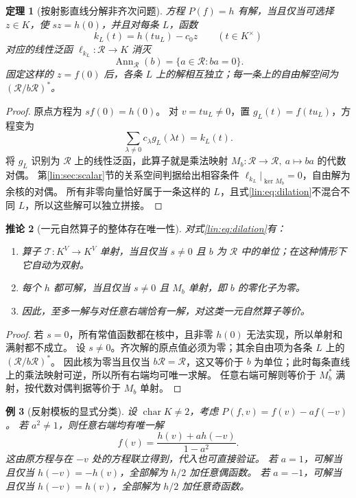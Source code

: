 \documentclass[11pt,a4paper,oneside,openany]{book}
\theoremstyle{lecture}
\newtheorem{theorem}{定理}[section]
\newtheorem{corollary}[theorem]{推论}
\newtheorem{example}[theorem]{例}
\newcommand{\T}{\mathcal T}
\numberwithin{equation}{section}
\begin{document}
\begin{theorem}[按射影直线分解非齐次问题]\label{lin:thm:dilationsolve}
方程 $P(f)=h$ 有解，当且仅当可选择 $z\in K$，使 $sz=h(0)$，并且对每条 $L$，函数
\[
 k_L(t)=h(tu_L)-c_0z\qquad(t\in K^\times)
\]
对应的线性泛函 $\ell_{k_L}:\mathcal R\to K$ 消灭
\[
 \operatorname{Ann}_{\mathcal R}(b)=\{a\in\mathcal R:ba=0\}.
\]
固定这样的 $z=f(0)$ 后，各条 $L$ 上的解相互独立；每一条上的自由解空间为 $(\mathcal R/b\mathcal R)^*$。
\end{theorem}
\begin{proof}
原点方程为 $sf(0)=h(0)$。
对 $v=tu_L\ne0$，置 $g_L(t)=f(tu_L)$，方程变为
\[
 \sum_{\lambda\ne0}c_\lambda g_L(\lambda t)=k_L(t).
\]
将 $g_L$ 识别为 $\mathcal R$ 上的线性泛函，此算子就是乘法映射
$M_b:\mathcal R\to\mathcal R,\ a\mapsto ba$ 的代数对偶。
第\ref{lin:sec:scalar}节的关系空间判据给出相容条件 $\ell_{k_L}|_{\ker M_b}=0$，自由解为余核的对偶。
所有非零向量恰好属于一条这样的 $L$，且式\eqref{lin:eq:dilation}不混合不同 $L$，所以这些解可以独立拼接。
\end{proof}

\begin{corollary}[一元自然算子的整体存在唯一性]\label{lin:cor:dilationbij}
对式\eqref{lin:eq:dilation}有：
\begin{enumerate}
\item 算子 $\T:K^V\to K^V$ 单射，当且仅当 $s\ne0$ 且 $b$ 为 $\mathcal R$ 中的单位；在这种情形下它自动为双射。
\item 每个 $h$ 都可解，当且仅当 $s\ne0$ 且 $M_b$ 单射，即 $b$ 的零化子为零。
\item 因此，至多一解与对任意右端恰有一解，对这类一元自然算子等价。
\end{enumerate}
\end{corollary}
\begin{proof}
若 $s=0$，所有常值函数都在核中，且非零 $h(0)$ 无法实现，所以单射和满射都不成立。
设 $s\ne0$。齐次解的原点值必须为零；其余自由项为各条 $L$ 上的 $(\mathcal R/b\mathcal R)^*$。
因此核为零当且仅当 $b\mathcal R=\mathcal R$，这又等价于 $b$ 为单位；此时每条直线上的乘法映射可逆，所以所有右端均可唯一求解。
任意右端可解则等价于 $M_b^*$ 满射，按代数对偶判据等价于 $M_b$ 单射。
\end{proof}

\begin{example}[反射模板的显式分类]
设 $\operatorname{char}K\ne2$，考虑 $P(f,v)=f(v)-a f(-v)$。
若 $a^2\ne1$，则任意右端均有唯一解
\[
 f(v)=\frac{h(v)+a h(-v)}{1-a^2}.
\]
这由原方程与在 $-v$ 处的方程联立得到，代入也可直接验证。
若 $a=1$，可解当且仅当 $h(-v)=-h(v)$，全部解为 $h/2$ 加任意偶函数。
若 $a=-1$，可解当且仅当 $h(-v)=h(v)$，全部解为 $h/2$ 加任意奇函数。
\end{example}
\end{document}

